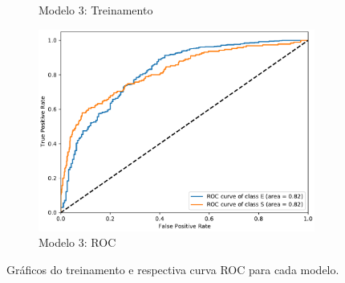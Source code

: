 \begin{figure}[!t]
\begin{subfigure}{.5\textwidth}
    \caption{Modelo 3: Treinamento}
    \label{fig:mod3_treinamento}
  \end{subfigure}%
  \begin{subfigure}{.5\textwidth}
    \includegraphics[width=.98\linewidth,right]{figures/roc_splus.pdf}
    \caption{Modelo 3: ROC}
    \label{fig:mod3_roc}
  \end{subfigure}
  \caption{Gráficos do treinamento e respectiva curva ROC para cada modelo.}
  \label{fig:graficos}
\end{figure}
